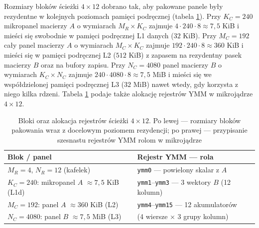 \documentclass[a4paper,12pt]{book} %
\begin{document}
Rozmiary bloków ścieżki $4 \times 12$ dobrano tak, aby pakowane panele były rezydentne w kolejnych poziomach pamięci podręcznej (tabela \ref{tab:gemm-bloki}). Przy $K_C = 240$ mikropanel macierzy $A$ o wymiarach $M_R \times K_C$ zajmuje $4 \cdot 240 \cdot 8 \approx 7{,}5$ KiB i mieści się swobodnie w pamięci podręcznej L1 danych ($32$ KiB). Przy $M_C = 192$ cały panel macierzy $A$ o wymiarach $M_C \times K_C$ zajmuje $192 \cdot 240 \cdot 8 \approx 360$ KiB i mieści się w pamięci podręcznej L2 ($512$ KiB) z zapasem na rezydentny pasek macierzy $B$ oraz na bufory zapisu. Przy $N_C = 4080$ panel macierzy $B$ o wymiarach $K_C \times N_C$ zajmuje $240 \cdot 4080 \cdot 8 \approx 7{,}5$ MiB i mieści się we współdzielonej pamięci podręcznej L3 ($32$ MiB) nawet wtedy, gdy korzysta z niego kilka rdzeni. Tabela \ref{tab:gemm-bloki} podaje także alokację rejestrów YMM w mikrojądrze $4 \times 12$.

\begin{table}[t!]
\centering
\caption{Bloki oraz alokacja rejestrów ścieżki $4 \times 12$. Po lewej --- rozmiary bloków pakowania wraz z docelowym poziomem rezydencji; po prawej --- przypisanie szesnastu rejestrów YMM rolom w mikrojądrze}
\label{tab:gemm-bloki}
\begin{tabular}{p{} p{}}
\hline
Blok / panel & Rejestr YMM --- rola \\
\hline
$M_R = 4$, $N_R = 12$ (kafelek) & \texttt{ymm0} --- powielony skalar z $A$ \\
$K_C = 240$: mikropanel $A$ $\approx 7{,}5$ KiB (L1d) & \texttt{ymm1}--\texttt{ymm3} --- 3 wektory $B$ (12 kolumn) \\
$M_C = 192$: panel $A$ $\approx 360$ KiB (L2) & \texttt{ymm4}--\texttt{ymm15} --- 12 akumulatorów \\
$N_C = 4080$: panel $B$ $\approx 7{,}5$ MiB (L3) & \quad (4 wiersze $\times$ 3 grupy kolumn) \\
\hline
\end{tabular}
\end{table}
\end{document}
